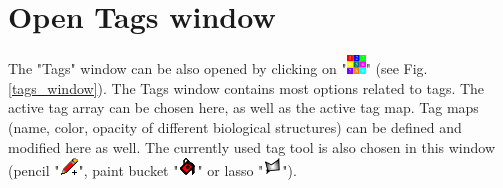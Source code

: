 \section{Open Tags window}
The "Tags" window can be also opened by clicking on "\includegraphics[scale=0.7]{images/04/tag_edit.png}" (see Fig. \ref{tags_window}). The Tags window contains most options related to tags. The active tag array can be chosen here, as well as the active tag map. Tag maps (name, color, opacity of different biological structures) can be defined and modified here as well. The currently used tag tool is also chosen in this window (pencil "\includegraphics[scale=0.7]{images/12/pencil.png}", paint bucket "\includegraphics[scale=0.7]{images/12/paint_bucket.png}" or lasso "\includegraphics[scale=0.7]{images/12/lasso.png}"). 


